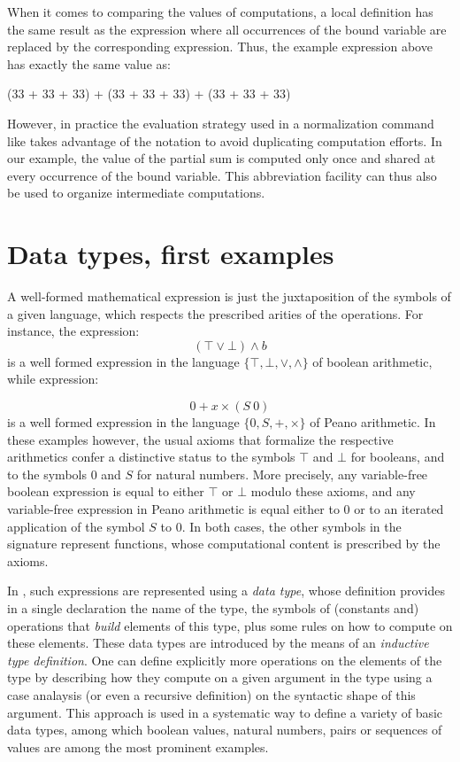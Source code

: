 When it comes to comparing the values of computations, a local definition
has the same result as the expression where all occurrences of the bound
variable are replaced by the corresponding expression.  Thus, the example
expression above has exactly the same value as:

\begin{coq}{}{}
(33 + 33 + 33) + (33 + 33 + 33) + (33 + 33 + 33)
\end{coq}

However, in practice the evaluation strategy used in a normalization
command like  takes advantage of the
  notation to
avoid duplicating computation efforts. In our example, the value of
the partial sum  is computed only once and shared at
every occurrence of the bound variable. This abbreviation facility can
thus also be used to organize intermediate computations.

\section{Data types, first examples}

A well-formed mathematical expression is just the juxtaposition of the
symbols of a given language, which respects the prescribed arities of
the operations. For instance, the expression:
\[(\top \vee \bot) \wedge b\]
is a well formed expression in the language $\{\top, \bot,\vee,\wedge\}$ of
boolean arithmetic, while expression:

\[ 0 + x \times (S\ 0) \]
is a well formed expression in the language $\{0,S, +, \times\}$ of
Peano arithmetic. In these examples however, the usual axioms that
formalize the respective arithmetics confer a distinctive status to
the symbols $\top$ and $\bot$ for booleans, and to the symbols $0$ and
$S$ for natural numbers. More precisely, any variable-free boolean expression
is equal to either $\top$ or $\bot$ modulo these axioms, and any
variable-free expression in Peano arithmetic is equal either to $0$ or
to an iterated application of the symbol $S$ to $0$. In both
cases, the other symbols in the signature represent functions, whose
computational content is prescribed by the axioms.

In \Coq{}, such expressions are represented using a \emph{data type},
whose definition provides in a single declaration the name of the
type, the symbols of (constants and) operations that \emph{build}
elements of this type, plus some rules on how to compute on these
elements. These data types are introduced by the means of an
\emph{inductive type definition}.
One can define explicitly more operations on the elements of
the type by describing how they compute on a given argument in the
type using a case analaysis (or even a recursive definition) on the
syntactic shape of this argument.
This approach is used in a systematic way to define a variety of basic
data types, among which boolean values, natural numbers, pairs or
sequences of values are among the most prominent examples.

